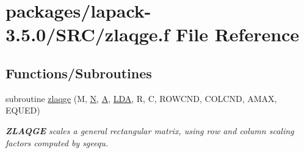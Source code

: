 \hypertarget{zlaqge_8f}{}\section{packages/lapack-\/3.5.0/\+S\+R\+C/zlaqge.f File Reference}
\label{zlaqge_8f}
\subsection*{Functions/\+Subroutines}
\begin{DoxyCompactItemize}
\item 
subroutine \hyperlink{group__complex16GEauxiliary_gad847103d204693cb8b9356ff7adfb9b1}{zlaqge} (M, \hyperlink{polmisc_8c_a0240ac851181b84ac374872dc5434ee4}{N}, \hyperlink{classA}{A}, \hyperlink{example__user_8c_ae946da542ce0db94dced19b2ecefd1aa}{L\+D\+A}, R, C, R\+O\+W\+C\+N\+D, C\+O\+L\+C\+N\+D, A\+M\+A\+X, E\+Q\+U\+E\+D)
\begin{DoxyCompactList}\small\item\em {\bfseries Z\+L\+A\+Q\+G\+E} scales a general rectangular matrix, using row and column scaling factors computed by sgeequ. \end{DoxyCompactList}\end{DoxyCompactItemize}
